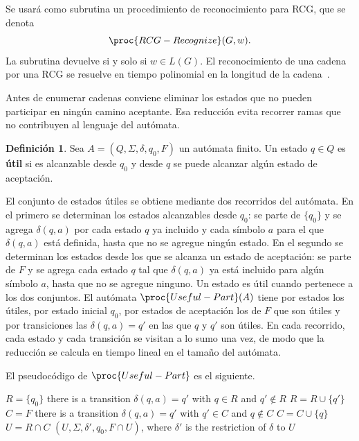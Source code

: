 \documentclass{report}
\theoremstyle{definition}
\newtheorem{definicion}{Definición}[chapter]
\theoremstyle{plain}
\theoremstyle{remark}
\begin{document}
Se usará como subrutina un procedimiento de reconocimiento para RCG, que
se denota
\[
  \proc{RCG-Recognize}(G,w).
\]
La subrutina devuelve  si y solo si $w \in L(G)$. El
reconocimiento de una cadena por una RCG se resuelve en tiempo
polinomial en la longitud de la
cadena~\cite{bertsch2001rcg,kallmeyer2010parsing}.

Antes de enumerar cadenas conviene eliminar los estados que no pueden
participar en ningún camino aceptante. Esa reducción evita recorrer
ramas que no contribuyen al lenguaje del autómata.

\begin{definicion}
Sea $A=(Q,\Sigma,\delta,q_0,F)$ un autómata finito. Un estado $q\in Q$
es \textbf{útil} si es alcanzable desde $q_0$ y desde
$q$ se puede alcanzar algún estado de aceptación.
\end{definicion}

El conjunto de estados útiles se obtiene mediante dos recorridos del
autómata. En el primero se determinan los estados alcanzables desde
$q_0$: se parte de $\{q_0\}$ y se agrega $\delta(q,a)$ por cada estado
$q$ ya incluido y cada símbolo $a$ para el que $\delta(q,a)$ está
definida, hasta que no se agregue ningún estado. En el segundo se
determinan los estados desde los que se alcanza un estado de aceptación:
se parte de $F$ y se agrega cada estado $q$ tal que $\delta(q,a)$ ya
está incluido para algún símbolo $a$, hasta que no se agregue ninguno.
Un estado es útil cuando pertenece a los dos conjuntos. El autómata
$\proc{Useful-Part}(A)$ tiene por estados los útiles, por estado inicial
$q_0$, por estados de aceptación los de $F$ que son útiles y por
transiciones las $\delta(q,a)=q'$ en las que $q$ y $q'$ son útiles. En
cada recorrido, cada estado y cada transición se visitan a lo sumo una
vez, de modo que la reducción se calcula en tiempo lineal en el tamaño
del autómata.

El pseudocódigo de $\proc{Useful-Part}$ es el siguiente.

\begin{codebox}
\li $R = \{q_0\}$
\li \While there is a transition $\delta(q,a)=q'$ with $q \in R$ and $q' \notin R$
\li \Do $R = R \cup \{q'\}$
    \End
\li $C = F$
\li \While there is a transition $\delta(q,a)=q'$ with $q' \in C$ and $q \notin C$
\li \Do $C = C \cup \{q\}$
    \End
\li $U = R \cap C$
\li \Return $(U, \Sigma, \delta', q_0, F \cap U)$, where $\delta'$ is the
    restriction of $\delta$ to $U$
\end{codebox}
\end{document}
